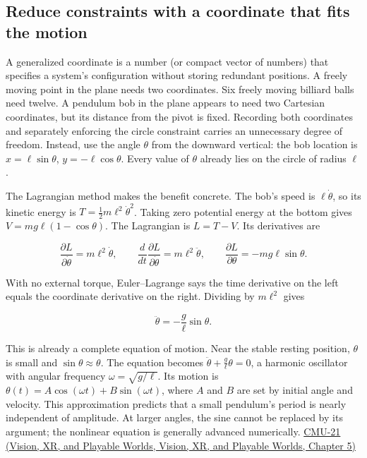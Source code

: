 \subsection{Reduce constraints with a coordinate that fits the motion}\label{04-visual-computing-ii-ch029-reduce-constraints-with-a-coordinate-that-fits-the-motion}

A generalized coordinate is a number (or compact vector of numbers) that specifies a system's configuration without storing redundant positions. A freely moving point in the plane needs two coordinates. Six freely moving billiard balls need twelve. A pendulum bob in the plane appears to need two Cartesian coordinates, but its distance from the pivot is fixed. Recording both coordinates and separately enforcing the circle constraint carries an unnecessary degree of freedom. Instead, use the angle \(\theta\) from the downward vertical: the bob location is \(x=\ell\sin\theta\), \(y=-\ell\cos\theta\). Every value of \(\theta\) already lies on the circle of radius \(\ell\).

The Lagrangian method makes the benefit concrete. The bob's speed is \(\ell\dot\theta\), so its kinetic energy is \(T=\tfrac12m\ell^2\dot\theta^2\). Taking zero potential energy at the bottom gives \(V=mg\ell(1-\cos\theta)\). The Lagrangian is \(L=T-V\). Its derivatives are

\[
\frac{\partial L}{\partial\dot\theta}=m\ell^2\dot\theta,\qquad
\frac{d}{dt}\frac{\partial L}{\partial\dot\theta}=m\ell^2\ddot\theta,\qquad
\frac{\partial L}{\partial\theta}=-mg\ell\sin\theta.
\]

With no external torque, Euler--Lagrange says the time derivative on the left equals the coordinate derivative on the right. Dividing by \(m\ell^2\) gives

\[
\ddot\theta=-\frac{g}{\ell}\sin\theta.
\]

This is already a complete equation of motion. Near the stable resting position, \(\theta\) is small and \(\sin\theta\approx\theta\). The equation becomes \(\ddot\theta+\frac{g}{\ell}\theta=0\), a harmonic oscillator with angular frequency \(\omega=\sqrt{g/\ell}\). Its motion is \(\theta(t)=A\cos(\omega t)+B\sin(\omega t)\), where \(A\) and \(B\) are set by initial angle and velocity. This approximation predicts that a small pendulum's period is nearly independent of amplitude. At larger angles, the sine cannot be replaced by its argument; the nonlinear equation is generally advanced numerically. \href{../07-Vision-XR-and-Playable-Worlds/main.pdf\#nameddest=04-visual-computing-ii-ch036-cmu-21---dynamics-and-time-integration}{CMU-21 (Vision, XR, and Playable Worlds, Vision, XR, and Playable Worlds, Chapter 5)}

